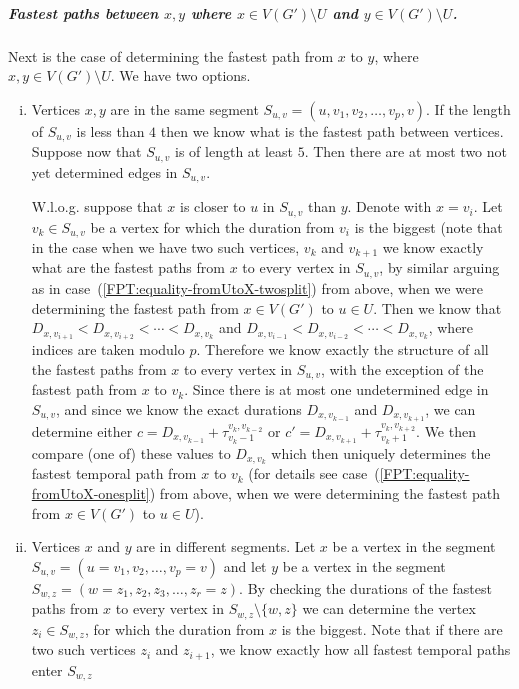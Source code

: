 \documentclass[a4paper,UKenglish,cleveref, autoref, thm-restate]{lipics-v2021}
\begin{document}
\subparagraph{\boldmath Fastest paths between $x,y$ where $x \in V(G') \setminus U$ and $y \in V(G') \setminus U$.}
Next is the case of determining the fastest path from $x$ to $y$, where $x,y \in V(G') \setminus U$.
We have two options.
\begin{enumerate}[(i)]
    \item Vertices $x,y$ are in the same segment $S_{u,v} = (u,v_1,v_2, \dots, v_p, v)$. 
    If the length of $S_{u,v}$ is less than $4$ then we know what is the fastest path between vertices.
    Suppose now that $S_{u,v}$ is of length at least $5$. Then there are at most two not yet determined edges in $S_{u,v}$.
    
    W.l.o.g. suppose that $x$ is closer to $u$ in $S_{u,v}$ than $y$.
    Denote with $x = v_i$.
    Let $v_k \in S_{u,v}$ be a vertex for which the duration from $v_i$ is the biggest 
    (note that in the case when we have two such vertices, $v_k$ and $v_{k+1}$ we know exactly what are the fastest paths from $x$ to every vertex in $S_{u,v}$,
    by similar arguing as in case~(\ref{FPT:equality-fromUtoX-twosplit}) from above, when we were determining the fastest path from $x \in V(G')$ to $u \in U$.
    Then we know that $D_{x,v_{i+1}} < D_{x,v_{i+2}} < \cdots  < D_{x,v_{k}}$ and $D_{x,v_{i-1}} < D_{x,v_{i-2}} < \cdots  < D_{x,v_{k}}$, where indices are taken modulo $p$.
    Therefore we know exactly the structure of all the fastest paths from $x$ to every vertex in $S_{u,v}$,
    with the exception of the fastest path from $x$ to $v_k$.
    Since there is at most one undetermined edge in $S_{u,v}$,
    and since we know the exact durations $D_{x,v_{k-1}}$ and $D_{x,v_{k+1}}$,
    we can determine either
    $c = D_{x,v_{k-1}} + \tau _ {v_k-1}^{v_k,v_{k-2}}$ or 
    $c' = D_{x,v_{k+1}} + \tau _ {v_k+1}^{v_k,v_{k+2}}$.
    We then compare (one of) these values to $D_{x,v_k}$ which then 
    uniquely determines the fastest temporal path from $x$ to $v_k$
    (for details see case~(\ref{FPT:equality-fromUtoX-onesplit}) from above, when we were determining the fastest path from $x \in V(G')$ to $u \in U$).
    \item Vertices $x$ and $y$ are in different segments. 
Let $x$ be a vertex in the segment $S_{u,v} = (u=v_1,v_2, \dots, v_p = v)$ and let $y$ be a vertex in the segment $S_{w,z} = (w=z_1, z_2,z_3, \dots, z_r = z)$.
By checking the durations of the fastest paths from $x$ to every vertex in $S_{w,z} \setminus \{w,z\}$
we can determine the vertex $z_i \in S_{w,z} $, for which the duration from $x$ is the biggest.
Note that if there are two such vertices $z_i$ and $z_{i+1}$, we know exactly how all fastest temporal paths enter $S_{w,z}$ 

\end{enumerate}
\end{document}
